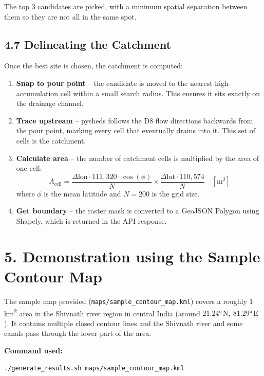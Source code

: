 \documentclass[12pt,a4paper]{article}
\begin{document}
The top 3 candidates are picked, with a minimum spatial separation between
them so they are not all in the same spot.

\subsection*{4.7 Delineating the Catchment}

Once the best site is chosen, the catchment is computed:

\begin{enumerate}[leftmargin=2em]
  \item \textbf{Snap to pour point} -- the candidate is moved to the nearest
        high-accumulation cell within a small search radius. This ensures it
        sits exactly on the drainage channel.
  \item \textbf{Trace upstream} -- pysheds follows the D8 flow directions
        backwards from the pour point, marking every cell that eventually
        drains into it. This set of cells is the catchment.
  \item \textbf{Calculate area} -- the number of catchment cells is multiplied
        by the area of one cell:
        \[
        A_{\text{cell}} =
          \frac{\Delta\text{lon} \cdot 111{,}320 \cdot \cos(\phi)}{N}
          \times
          \frac{\Delta\text{lat} \cdot 110{,}574}{N}
          \quad [\text{m}^2]
        \]
        where $\phi$ is the mean latitude and $N = 200$ is the grid size.
  \item \textbf{Get boundary} -- the raster mask is converted to a GeoJSON
        Polygon using Shapely, which is returned in the API response.
\end{enumerate}

\section*{5. Demonstration using the Sample Contour Map}

The sample map provided (\texttt{maps/sample\_contour\_map.kml}) covers a
roughly 1 km\textsuperscript{2} area in the Shivnath river region in central
India (around $21.24°\,\text{N},\ 81.29°\,\text{E}$). It contains multiple
closed contour lines and the Shivnath river and some canals pass through the
lower part of the area.

\textbf{Command used:}
\begin{lstlisting}[language=bash]
./generate_results.sh maps/sample_contour_map.kml
\end{lstlisting}
\end{document}
